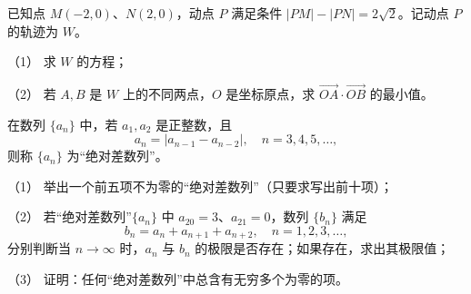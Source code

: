 \begin{question}
已知点 $M(-2,0)$、$N(2,0)$，动点 $P$ 满足条件 $|PM|-|PN|=2\sqrt2$。记动点 $P$ 的轨迹为 $W$。

（1） 求 $W$ 的方程；

（2） 若 $A,B$ 是 $W$ 上的不同两点，$O$ 是坐标原点，求 $\overrightarrow{OA}\cdot\overrightarrow{OB}$ 的最小值。

\end{question}
\begin{question}
在数列 $\{a_n\}$ 中，若 $a_1,a_2$ 是正整数，且
\nopagebreak[4]
\[
a_n=|a_{n-1}-a_{n-2}|,\quad n=3,4,5,\ldots,
\]
则称 $\{a_n\}$ 为“绝对差数列”。

（1） 举出一个前五项不为零的“绝对差数列”（只要求写出前十项）；

（2） 若“绝对差数列”$\{a_n\}$ 中 $a_{20}=3$、$a_{21}=0$，数列 $\{b_n\}$ 满足
\nopagebreak[4]
\[
b_n=a_n+a_{n+1}+a_{n+2},\quad n=1,2,3,\ldots,
\]
分别判断当 $n\to\infty$ 时，$a_n$ 与 $b_n$ 的极限是否存在；如果存在，求出其极限值；

（3） 证明：任何“绝对差数列”中总含有无穷多个为零的项。

\end{question}